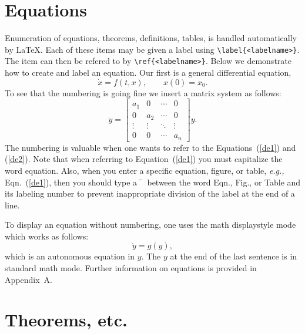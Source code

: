 \section{Equations}

Enumeration of equations, theorems, definitions, tables, is handled
automatically by \LaTeX.  Each of these items may be given a label
using \verb+\label{<labelname>}+.  The item can then be refered to
by \verb+\ref{<labelname>}+.  Below we demonstrate how
to create and label an equation. Our first is a general differential
equation,
\begin{equation}
  \dot{x} = f(t,x),\qquad x(0)= x_0. \label{de1}
\end{equation}
To see that the numbering is going fine we insert a matrix system as
follows:
\begin{equation}
  \dot{y} =
  \begin{bmatrix}
    a_1 & 0 & \cdots & 0 \\
    0 & a_2 & \cdots & 0 \\
    \vdots & \vdots & \ddots & \vdots \\
    0 & 0 & \cdots & a_n
  \end{bmatrix}
  y.
  \label{de2}
\end{equation}
The numbering is valuable when one wants to refer to the
Equations~(\ref{de1}) and (\ref{de2}). Note that when referring to
Equation~(\ref{de1}) you must capitalize the word equation. Also, when
you enter a specific equation, figure, or table, \emph{e.g.,}
Eqn.~(\ref{de1}), then you should type a $\tilde{\phantom{x}}$ between
the word Eqn., Fig., or Table and its labeling number to prevent
inappropriate division of the label at the end of a line.

To display an equation without numbering, one uses the math
displaystyle mode which works as follows:
\begin{equation*}
  \dot{y} = g(y),
\end{equation*}
which is an autonomous equation in $y$. The $y$ at the end of the last
sentence is in standard math mode. Further information on equations is
provided in Appendix~A.


\section{Theorems, etc.}

